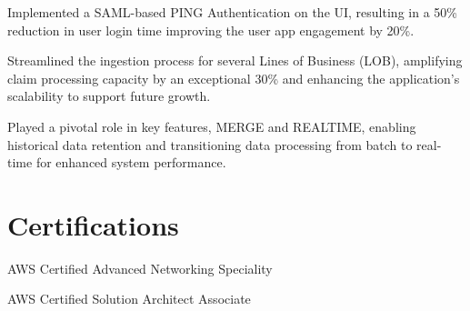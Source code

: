 \documentclass[]{deedy-resume-openfont}
\begin{document}
\begin{minipage}[t]{0.66\textwidth}
\vspace{\topsep}
\begin{tightemize}
\item Implemented a SAML-based PING Authentication on the UI, resulting in a 50\% reduction in user login time improving the user app engagement by 20\%. 
\item Streamlined the ingestion process for several Lines of Business (LOB), amplifying claim processing capacity by an exceptional 30\% and enhancing the application's scalability to support future growth.
\item Played a pivotal role in key features, MERGE and REALTIME, enabling historical data retention and transitioning data processing from batch to real-time for enhanced system performance.
\end{tightemize}
\sectionsep



\section{Certifications}
\vspace{4mm}
\begin{tightemize}
\item AWS Certified Advanced Networking Speciality
\item AWS Certified Solution Architect Associate
\end{tightemize}
\sectionsep



\end{minipage} 
\end{document}
